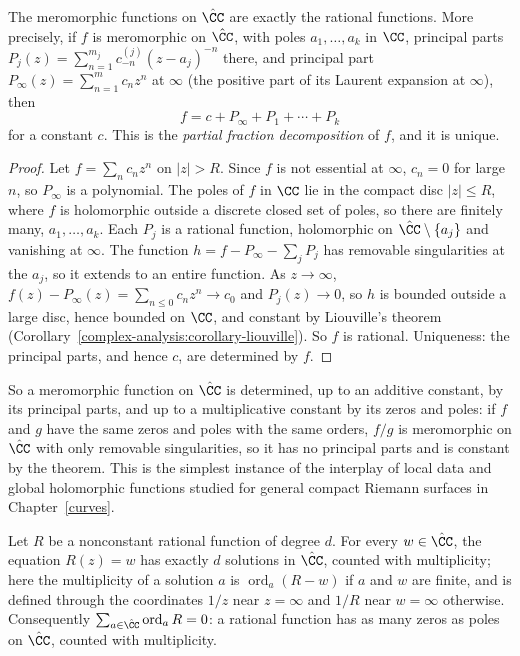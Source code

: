 \begin{theorem}\label{complex-analysis:theorem-rational}
The meromorphic functions on $\hat{\CC}$ are exactly the rational functions. More precisely, if $f$ is meromorphic on $\hat{\CC}$, with poles $a_1, \ldots, a_k$ in $\CC$, principal parts $P_j(z) = \sum_{n=1}^{m_j}c^{(j)}_{-n}(z - a_j)^{-n}$ there,
and principal part $P_\infty(z) = \sum_{n=1}^mc_nz^n$ at $\infty$ (the positive part of its Laurent expansion at $\infty$), then
\[
f = c + P_\infty + P_1 + \cdots + P_k
\]
for a constant $c$. This is the \emph{partial fraction decomposition} of $f$, and it is unique.
\end{theorem}

\begin{proof}
Let $f = \sum_nc_nz^n$ on $|z| > R$. Since $f$ is not essential at $\infty$, $c_n = 0$ for large $n$, so $P_\infty$ is a polynomial. The poles of $f$ in $\CC$ lie in the compact disc $|z| \leq R$, where $f$ is
holomorphic outside a discrete closed set of poles, so there are finitely many, $a_1, \ldots, a_k$. Each $P_j$ is a rational function, holomorphic on $\hat{\CC} \setminus \{a_j\}$ and vanishing at $\infty$. The function
$h = f - P_\infty - \sum_jP_j$ has removable singularities at the $a_j$, so it extends to an entire function. As $z \to \infty$, $f(z) - P_\infty(z) = \sum_{n \leq 0}c_nz^n \to c_0$ and $P_j(z) \to 0$, so $h$ is bounded
outside a large disc, hence bounded on $\CC$, and constant by Liouville's theorem (Corollary~\ref{complex-analysis:corollary-liouville}). So $f$ is rational. Uniqueness: the principal parts, and hence $c$,
are determined by $f$.
\end{proof}

So a meromorphic function on $\hat{\CC}$ is determined, up to an additive constant, by its principal parts, and up to a multiplicative constant by its zeros and poles: if $f$ and $g$ have the same zeros and
poles with the same orders, $f/g$ is meromorphic on $\hat{\CC}$ with only removable singularities, so it has no principal parts and is constant by the theorem. This is the simplest instance of the
interplay of local data and global holomorphic functions studied for general compact Riemann surfaces in Chapter~\ref{curves}.

\begin{proposition}\label{complex-analysis:proposition-rational-degree}
Let $R$ be a nonconstant rational function of degree $d$. For every $w \in \hat{\CC}$, the equation $R(z) = w$ has exactly $d$ solutions in $\hat{\CC}$, counted with multiplicity; here the multiplicity of a solution
$a$ is $\operatorname{ord}_a(R - w)$ if $a$ and $w$ are finite, and is defined through the coordinates $1/z$ near $z = \infty$ and $1/R$ near $w = \infty$ otherwise. Consequently
$\sum_{a \in \hat{\CC}}\operatorname{ord}_aR = 0$: a rational function has as many zeros as poles on $\hat{\CC}$, counted with multiplicity.
\end{proposition}

